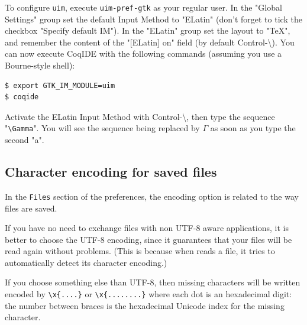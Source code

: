To configure \texttt{uim}, execute \texttt{uim-pref-gtk} as your regular user.
In the "Global Settings" group set the default Input Method to "ELatin" (don't
forget to tick the checkbox "Specify default IM"). In the "ELatin" group set the
layout to "TeX", and remember the content of the "[ELatin] on" field (by default
Control-\textbackslash). You can now execute CoqIDE with the following commands (assuming
you use a Bourne-style shell):

\begin{verbatim}
$ export GTK_IM_MODULE=uim
$ coqide
\end{verbatim}

Activate the ELatin Input Method with Control-\textbackslash, then type the
sequence "\verb=\Gamma=". You will see the sequence being
replaced by $\Gamma$ as soon as you type the second "a".

\subsection[Character encoding for saved files]{Character encoding for saved files\label{sec:coqidecharencoding}}

In the \texttt{Files} section of the preferences, the encoding option
is related to the way files are saved. 

If you have no need to exchange files with non UTF-8 aware
applications, it is better to choose the UTF-8 encoding, since it
guarantees that your files will be read again without problems. (This
is because when \CoqIDE{} reads a file, it tries to automatically
detect its character encoding.) 

If you choose something else than UTF-8, then missing characters will
be written encoded by \verb|\x{....}| or \verb|\x{........}| where
each dot is an hexadecimal digit: the number between braces is the
hexadecimal Unicode index for the missing character.


